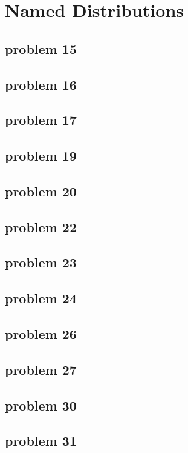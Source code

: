 \section{Named Distributions}

\subsection{problem 15}


\subsection{problem 16}


\subsection{problem 17}


\subsection{problem 19}


\subsection{problem 20}


\subsection{problem 22}


\subsection{problem 23}


\subsection{problem 24}


\subsection{problem 26}


\subsection{problem 27}


\subsection{problem 30}


\subsection{problem 31}
